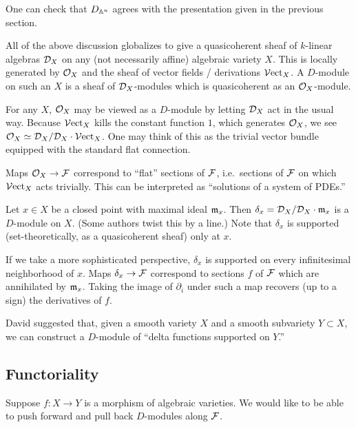 \documentclass{article}
\begin{document}
\begin{ex}
	One can check that $D_{\AA^n}$ agrees with the presentation given in the previous section.
\end{ex}

All of the above discussion globalizes to give a quasicoherent sheaf of $k$-linear algebras $\Dc_X$ on any (not necessarily affine) algebraic variety $X$.
This is locally generated by $\Oc_X$ and the sheaf of vector fields / derivations $\Vectc_X$.
A $D$-module on such an $X$ is a sheaf of $\Dc_X$-modules which is quasicoherent as an $\Oc_X$-module.

\begin{ex}
	For any $X$, $\Oc_X$ may be viewed as a $D$-module by letting $\Dc_X$ act in the usual way.
	Because $\Vectc_X$ kills the constant function $1$, which generates $\Oc_X$, we see $\Oc_X \simeq \Dc_X / \Dc_X \cdot \Vectc_X$.
	One may think of this as the trivial vector bundle equipped with the standard flat connection.

	Maps $\Oc_X \to \Fc$ correspond to ``flat'' sections of $\Fc$, i.e.\ sections of $\Fc$ on which $\Vectc_X$ acts trivially.
	This can be interpreted as ``solutions of a system of PDEs.''
\end{ex}

\begin{ex}
	Let $x \in X$ be a closed point with maximal ideal $\mf_x$.
	Then $\delta_x = \Dc_X / \Dc_X \cdot \mf_x$ is a $D$-module on $X$.
	(Some authors twist this by a line.)
	Note that $\delta_x$ is supported (set-theoretically, as a quasicoherent sheaf) only at $x$.

	If we take a more sophisticated perspective, $\delta_x$ is supported on every infinitesimal neighborhood of $x$.
	Maps $\delta_x \to \Fc$ correspond to sections $f$ of $\Fc$ which are annihilated by $\mf_x$.
	Taking the image of $\partial_i$ under such a map recovers (up to a sign) the derivatives of $f$.
\end{ex}

\begin{ex}
	David suggested that, given a smooth variety $X$ and a smooth subvariety $Y \subset X$, we can construct a $D$-module of ``delta functions supported on $Y$.''
\end{ex}

\subsection{Functoriality}

Suppose $f: X \to Y$ is a morphism of algebraic varieties.
We would like to be able to push forward and pull back $D$-modules along $\Fc$.
\end{document}
